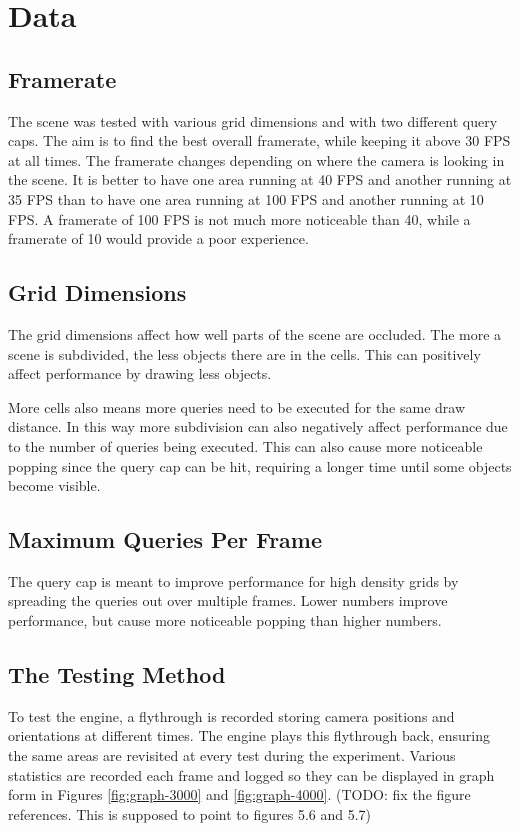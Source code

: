\documentclass[12pt]{ucthesis}
\begin{document}
\section{Data}
\label{data}

\subsection{Framerate}
\label{framerate}

The scene was tested with various grid dimensions and with two different query caps.
The aim is to find the best overall framerate, while keeping it above 30 FPS at all times.
The framerate changes depending on where the camera is looking in the scene.
It is better to have one area running at 40 FPS and another running at 35 FPS than to have one area running at 100 FPS and another running at 10 FPS.
A framerate of 100 FPS is not much more noticeable than 40, while a framerate of 10 would provide a poor experience.

\subsection{Grid Dimensions}
\label{grid-dimensions}
The grid dimensions affect how well parts of the scene are occluded.
The more a scene is subdivided, the less objects there are in the cells.
This can positively affect performance by drawing less objects.

More cells also means more queries need to be executed for the same draw distance.
In this way more subdivision can also negatively affect performance due to the number of queries being executed.
This can also cause more noticeable popping since the query cap can be hit, requiring a longer time until some objects become visible.

\subsection{Maximum Queries Per Frame}
\label{maximum-queries-per-frame}
The query cap is meant to improve performance for high density grids by spreading the queries out over multiple frames.
Lower numbers improve performance, but cause more noticeable popping than higher numbers.

\subsection{The Testing Method}
\label{the-testing-method}
To test the engine, a flythrough is recorded storing camera positions and orientations at different times.
The engine plays this flythrough back, ensuring the same areas are revisited at every test during the experiment.
Various statistics are recorded each frame and logged so they can be displayed in graph form in Figures \ref{fig:graph-3000} and \ref{fig:graph-4000}.
(TODO: fix the figure references.  This is supposed to point to figures 5.6 and 5.7)
\end{document}
